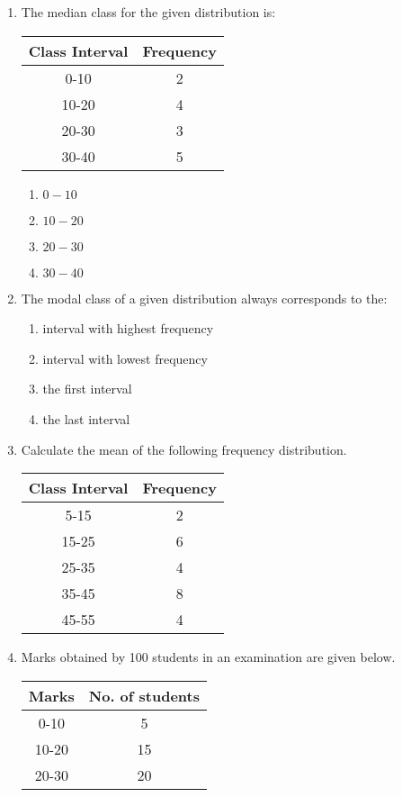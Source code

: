 \documentclass{article}
\begin{document}
\begin{enumerate}
	\item The median class for the given distribution is:\\
		\centering
		\begin{tabular}{|c|c|}
			\hline
			Class Interval & Frequency \\
			\hline
			0-10 & 2 \\
			10-20 & 4\\
			20-30 & 3\\
			30-40 & 5\\ 
			\hline
		\end{tabular}
		\begin{enumerate}
			\item $0-10$
			\item $10-20$
			\item $20-30$
			\item $30-40$
		\end{enumerate}
	\item The modal class of a given distribution always corresponds to the:
		\begin{enumerate}
			\item interval with highest frequency 
			\item interval with lowest frequency
			\item the first interval
			\item the last interval
		\end{enumerate}
	\item Calculate the mean of the following frequency distribution.\\
		\centering
		\begin{tabular}{|c|c|}
			\hline
			Class Interval & Frequency \\
			\hline
			5-15 & 2 \\
			15-25 & 6 \\
			25-35 & 4 \\
			35-45 & 8 \\
			45-55 & 4\\
			\hline
		\end{tabular}
	\item Marks obtained by 100 students in an examination are given below.
		\centering
		\begin{tabular}{|c|c|}
			\hline
			Marks & No. of students \\
			\hline
			0-10 & 5 \\
			10-20 & 15 \\
			20-30 & 20 \\

\end{tabular}
\end{enumerate}
\end{document}

